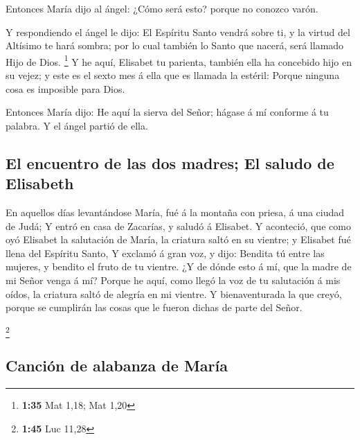  Entonces María dijo al ángel: ¿Cómo será esto? porque no
conozco varón.

 Y respondiendo el ángel le dijo: El Espíritu Santo
vendrá sobre ti, y la virtud del Altísimo te hará sombra; por lo cual
también lo Santo que nacerá, será llamado Hijo de Dios. \footnote{\textbf{1:35}
  Mat 1,18; Mat 1,20}  Y he aquí, Elisabet tu parienta,
también ella ha concebido hijo en su vejez; y este es el sexto mes á
ella que es llamada la estéril:  Porque ninguna cosa es
imposible para Dios.

 Entonces María dijo: He aquí la sierva del Señor; hágase
á mí conforme á tu palabra. Y el ángel partió de ella.

\hypertarget{el-encuentro-de-las-dos-madres-el-saludo-de-elisabeth}{%
\subsection{El encuentro de las dos madres; El saludo de
Elisabeth}\label{el-encuentro-de-las-dos-madres-el-saludo-de-elisabeth}}

 En aquellos días levantándose María, fué á la montaña
con priesa, á una ciudad de Judá;  Y entró en casa de
Zacarías, y saludó á Elisabet.  Y aconteció, que como oyó
Elisabet la salutación de María, la criatura saltó en su vientre; y
Elisabet fué llena del Espíritu Santo,  Y exclamó á gran
voz, y dijo: Bendita tú entre las mujeres, y bendito el fruto de tu
vientre.  ¿Y de dónde esto á mí, que la madre de mi Señor
venga á mí?  Porque he aquí, como llegó la voz de tu
salutación á mis oídos, la criatura saltó de alegría en mi vientre.
 Y bienaventurada la que creyó, porque se cumplirán las
cosas que le fueron dichas de parte del Señor.

\footnote{\textbf{1:45} Luc 11,28}

\hypertarget{canciuxf3n-de-alabanza-de-maruxeda}{%
\subsection{Canción de alabanza de
María}\label{canciuxf3n-de-alabanza-de-maruxeda}}


